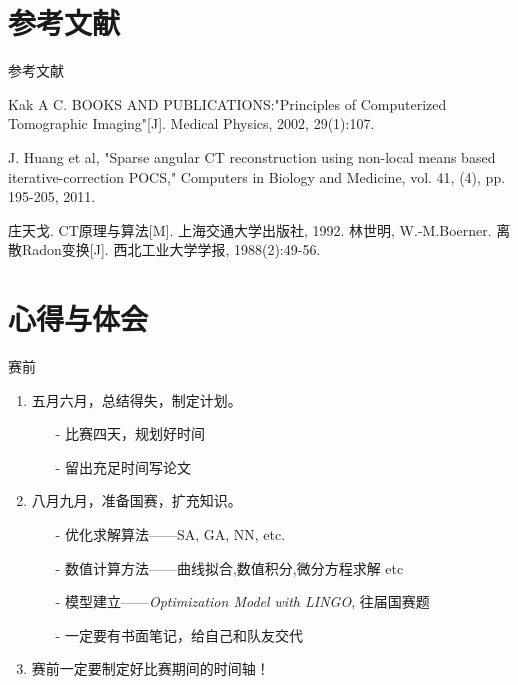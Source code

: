 \documentclass{beamer} %
\begin{document}
\section{参考文献}
\begin{frame}{参考文献}
	\begin{thebibliography}{0}
		    
		Kak A C. BOOKS AND PUBLICATIONS:"Principles of Computerized Tomographic Imaging"[J]. Medical Physics, 2002, 29(1):107.
		    
		J. Huang et al, "Sparse angular CT reconstruction using non-local means based iterative-correction POCS," Computers in Biology and Medicine, vol. 41, (4), pp. 195-205, 2011.
		    
		庄天戈. CT原理与算法[M]. 上海交通大学出版社, 1992.
		林世明, W.-M.Boerner. 离散Radon变换[J]. 西北工业大学学报, 1988(2):49-56.
	\end{thebibliography}
\end{frame} %


\section*{心得与体会}
\begin{frame}{赛前}
	\begin{enumerate}
	  \item 五月六月，总结得失，制定计划。
		\begin{enumerate}
		  \item[-] 比赛四天，规划好时间
		  \item[-] 留出充足时间写论文
		\end{enumerate}
	  \item 八月九月，准备国赛，扩充知识。
		\begin{enumerate}
		  \item[-] 优化求解算法——SA, GA, NN, etc.
		  \item[-] 数值计算方法——曲线拟合,数值积分,微分方程求解 etc
		  \item[-] 模型建立——\emph{Optimization Model with LINGO}, 往届国赛题
		  \item[-] 一定要有书面笔记，给自己和队友交代
		\end{enumerate}
	  \item 赛前一定要制定好比赛期间的时间轴！
	\end{enumerate}
  \end{frame}
\end{document}
